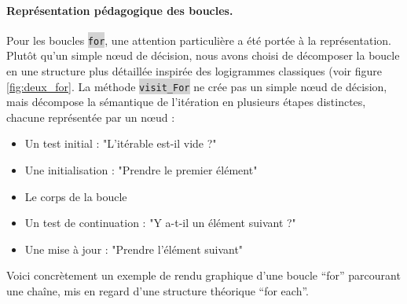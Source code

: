 \documentclass[11pt,a4paper]{article}
\newcommand{\code}[1]{\colorbox{lightgray}{\texttt{\small #1}}}
\begin{document}
\paragraph{Représentation pédagogique des boucles.} Pour les boucles \code{for}, une attention particulière a été portée à la représentation. Plutôt qu'un simple nœud de décision, nous avons choisi de décomposer la boucle en une structure plus détaillée inspirée des logigrammes classiques (voir figure \ref{fig:deux_for}. La méthode \code{visit\_For} ne crée pas un simple nœud de décision, mais décompose la sémantique de l'itération en plusieurs étapes distinctes, chacune représentée par un nœud :
\begin{itemize}
    \item Un test initial : "L'itérable est-il vide ?"
    \item Une initialisation : "Prendre le premier élément"
    \item Le corps de la boucle
    \item Un test de continuation : "Y a-t-il un élément suivant ?"
    \item Une mise à jour : "Prendre l'élément suivant"
\end{itemize}
Voici concrètement un exemple de rendu graphique d'une boucle ``for'' parcourant une chaîne, mis en regard d'une structure théorique ``for each''.
\end{document}

